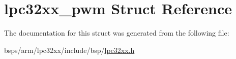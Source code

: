 \hypertarget{structlpc32xx__pwm}{}\section{lpc32xx\+\_\+pwm Struct Reference}
\label{structlpc32xx__pwm}


The documentation for this struct was generated from the following file\+:\begin{DoxyCompactItemize}
\item 
bsps/arm/lpc32xx/include/bsp/\mbox{\hyperlink{lpc32xx_8h}{lpc32xx.\+h}}\end{DoxyCompactItemize}

